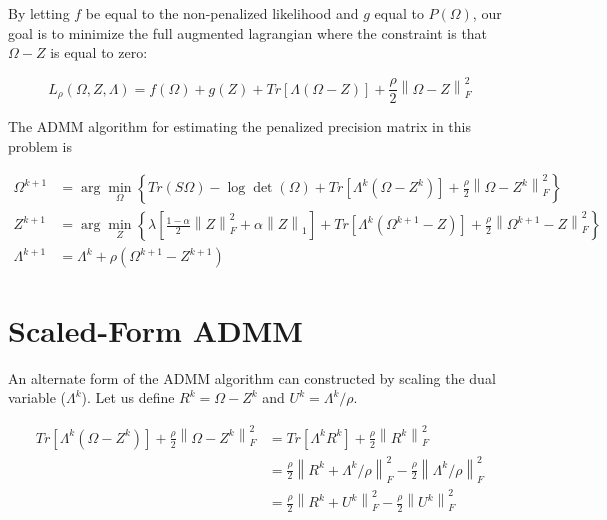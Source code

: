 \documentclass[12pt,]{book}
\theoremstyle{definition}
\theoremstyle{definition}
\theoremstyle{definition}
\theoremstyle{remark}
\begin{document}
By letting \(f\) be equal to the non-penalized likelihood and \(g\)
equal to \(P\left( \Omega \right)\), our goal is to minimize the full
augmented lagrangian where the constraint is that \(\Omega - Z\) is
equal to zero:

\[ L_{\rho}(\Omega, Z, \Lambda) = f\left(\Omega\right) + g\left(Z\right) + Tr\left[\Lambda\left(\Omega - Z\right)\right] + \frac{\rho}{2}\left\|\Omega - Z\right\|_{F}^{2} \]

The ADMM algorithm for estimating the penalized precision matrix in this
problem is

\begin{align}
  \Omega^{k + 1} &= \arg\min_{\Omega}\left\{ Tr\left(S\Omega\right) - \log\det\left(\Omega\right) + Tr\left[\Lambda^{k}\left(\Omega - Z^{k}\right)\right] + \frac{\rho}{2}\left\| \Omega - Z^{k} \right\|_{F}^{2} \right\} \\
  Z^{k + 1} &= \arg\min_{Z}\left\{ \lambda\left[ \frac{1 - \alpha}{2}\left\| Z \right\|_{F}^{2} + \alpha\left\| Z \right\|_{1} \right] + Tr\left[\Lambda^{k}\left(\Omega^{k + 1} - Z\right)\right] + \frac{\rho}{2}\left\| \Omega^{k + 1} - Z \right\|_{F}^{2} \right\} \\
  \Lambda^{k + 1} &= \Lambda^{k} + \rho\left( \Omega^{k + 1} - Z^{k + 1} \right)
\end{align}

\vspace{1cm}

\hypertarget{scaled-form-admm}{%
\section{Scaled-Form ADMM}\label{scaled-form-admm}}

An alternate form of the ADMM algorithm can constructed by scaling the
dual variable (\(\Lambda^{k}\)). Let us define
\(R^{k} = \Omega - Z^{k}\) and \(U^{k} = \Lambda^{k}/\rho\).

\begin{align*}
  Tr\left[ \Lambda^{k}\left( \Omega - Z^{k} \right) \right] + \frac{\rho}{2}\left\| \Omega - Z^{k} \right\|_{F}^{2} &= Tr\left[ \Lambda^{k}R^{k} \right] + \frac{\rho}{2}\left\| R^{k} \right\|_{F}^{2} \\
  &= \frac{\rho}{2}\left\| R^{k} + \Lambda^{k}/\rho \right\|_{F}^{2} - \frac{\rho}{2}\left\| \Lambda^{k}/\rho \right\|_{F}^{2} \\
  &= \frac{\rho}{2}\left\| R^{k} + U^{k} \right\|_{F}^{2} - \frac{\rho}{2}\left\| U^{k} \right\|_{F}^{2}
\end{align*}
\end{document}
